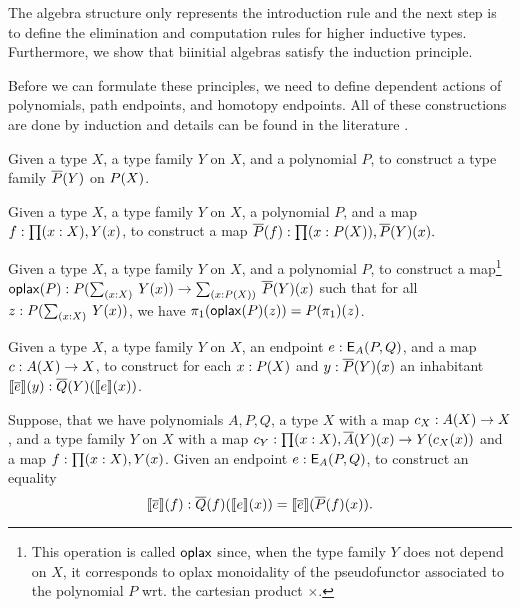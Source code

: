 The algebra structure only represents the introduction rule
and the next step is to define the elimination and computation rules for higher inductive types.
Furthermore, we show that biinitial algebras satisfy the induction principle.

Before we can formulate these principles, we need to define dependent actions of polynomials, path endpoints, and homotopy endpoints.
All of these constructions are done by induction and details can be found in the literature \cite{DBLP:journals/entcs/DybjerM18,hermida1998structural,van2019construction}.

\begin{problem}
\label{prob:poly_dact}
Given a type $X$, a type family $Y$ on $X$, and a polynomial $P$,
to construct a type family $\overline{P}(Y)$ on $P(X)$.
\end{problem}

\begin{problem}
\label{prob:poly_dmap}
Given a type $X$, a type family $Y$ on $X$, a polynomial $P$, and a map $f : \prod (x : X) , Y(x)$,
to construct a map
$
\overline{P}(f) : \prod (x : P(X)) , \overline{P}(Y)(x).
$
\end{problem}

\begin{problem}
\label{prob:poly_pr}
Given a type $X$, a type family $Y$ on $X$, and a polynomial $P$, to construct a map\footnote{This operation is called $\mathsf{oplax}$ since, when the type family $Y$ does not depend on $X$, it corresponds to oplax monoidality of the pseudofunctor associated to the polynomial $P$ wrt. the cartesian product $\times$.}
$
\polyoplax P : \polyAct{P}{\Sum (x : X). Y(x)} \rightarrow \Sum (x : \polyAct{P}{X}). \polyDact{P}{Y}(x)
$
such that for all $z :  \polyAct{P}{\Sum (x : X). Y(x)}$, we have $\pi_1(\mathsf{oplax}(P)(z)) = P(\pi_1)(z)$.
\end{problem}

\begin{problem}
\label{prob:endpoint_dact}
Given a type $X$, a type family $Y$ on $X$, an endpoint $e : \mathsf{E}_{A}(P,Q)$, and a map $c : A(X) \rightarrow X$,
to construct for each $x : P(X)$ and $y : \overline{P}(Y)(x)$ an inhabitant $\llbracket \overline{e} \rrbracket(y) : \overline{Q}(Y)(\llbracket e \rrbracket(x))$.
\end{problem}

\begin{problem}
\label{prob:endpoint_dact_natural}
Suppose, that we have polynomials $A, P, Q$, a type $X$ with a map $c_X : A(X) \rightarrow X$,
and a type family $Y$ on $X$ with a map $c_Y : \prod (x : X) , \overline{A}(Y)(x) \rightarrow Y(c_X(x))$
and a map $f : \prod (x : X) , Y(x)$.
Given an endpoint $e : \mathsf{E}_{A}(P,Q)$,
to construct an equality
\[
\llbracket \overline{e} \rrbracket(f) : \overline{Q}(f)(\llbracket e \rrbracket(x)) = \llbracket \overline{e} \rrbracket(\overline{P}(f)(x)).
\]
\end{problem}

